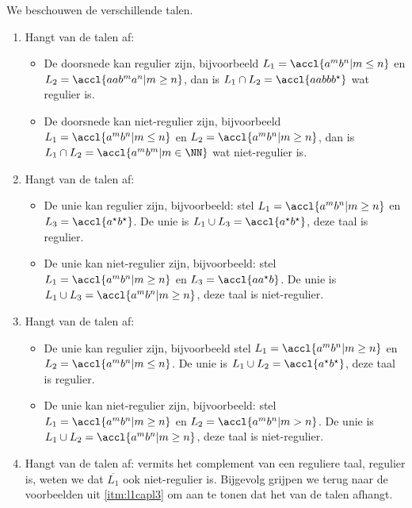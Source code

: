 \documentclass{article}
\begin{document}
\begin{answer}
We beschouwen de verschillende talen.
\begin{enumerate}
 \item\label{itm:l1capl3} Hangt van de talen af:
 \begin{itemize}
  \item De doorsnede kan regulier zijn, bijvoorbeeld $L_1=\accl{a^mb^n|m\leq n}$ en $L_2=\accl{aab^ma^n|m\geq n}$, dan is $L_1\cap L_2=\accl{aabbb^\star}$ wat regulier is.
  \item De doorsnede kan niet-regulier zijn, bijvoorbeeld $L_1=\accl{a^mb^n|m\leq n}$ en $L_2=\accl{a^mb^n|m\geq n}$, dan is $L_1\cap L_2=\accl{a^mb^m|m\in\NN}$ wat niet-regulier is.
 \end{itemize}
 \item Hangt van de talen af:
 \begin{itemize}
  \item De unie kan regulier zijn, bijvoorbeeld: stel $L_1=\accl{a^mb^n|m\geq n}$ en $L_3=\accl{a^\star b^\star}$. De unie is $L_1\cup L_3=\accl{a^\star b^\star}$, deze taal is regulier.
  \item De unie kan niet-regulier zijn, bijvoorbeeld: stel $L_1=\accl{a^mb^n|m\geq n}$ en $L_3=\accl{aa^\star b}$. De unie is $L_1\cup L_3=\accl{a^mb^n|m\geq n}$, deze taal is niet-regulier.
 \end{itemize}
 \item Hangt van de talen af:
 \begin{itemize}
  \item De unie kan regulier zijn, bijvoorbeeld stel $L_1=\accl{a^mb^n|m\geq n}$ en $L_2=\accl{a^mb^n|m\leq n}$. De unie is $L_1\cup L_2=\accl{a^\star b^\star}$, deze taal is regulier.
  \item De unie kan niet-regulier zijn, bijvoorbeeld: stel $L_1=\accl{a^mb^n|m\geq n}$ en $L_2=\accl{a^mb^n|m> n}$. De unie is $L_1\cup L_2=\accl{a^mb^n|m\geq n}$, deze taal is niet-regulier.
 \end{itemize}
 \item Hangt van de talen af: vermits het complement van een reguliere taal, regulier is, weten we dat $\overline{L_1}$ ook niet-regulier is. Bijgevolg grijpen we terug naar de voorbeelden uit \ref{itm:l1capl3} om aan te tonen dat het van de talen afhangt.
\end{enumerate}
\end{answer}
\end{document}
